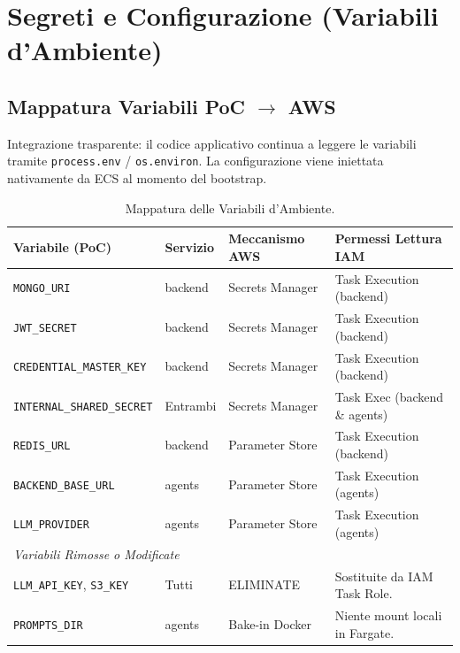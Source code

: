 \documentclass[11pt,a4paper]{article}
\begin{document}
\section{Segreti e Configurazione (Variabili d'Ambiente)}
\label{sec:aws-config}

\subsection{Mappatura Variabili PoC $\to$ AWS}

Integrazione trasparente: il codice applicativo continua a leggere le variabili tramite \texttt{process.env} / \texttt{os.environ}. La configurazione viene iniettata nativamente da ECS al momento del bootstrap.

\begin{table}[H]
\centering
\caption{Mappatura delle Variabili d'Ambiente.}
\label{tab:aws-env}
\vspace{2mm}
\renewcommand{\arraystretch}{1.15}
\begin{tabularx}{\textwidth}{|l|l|X|X|}
\hline
\textbf{Variabile (PoC)} & \textbf{Servizio} & \textbf{Meccanismo AWS} & \textbf{Permessi Lettura IAM} \\ \hline
\texttt{MONGO\_URI} & backend & Secrets Manager & Task Execution (backend) \\ \hline
\texttt{JWT\_SECRET} & backend & Secrets Manager & Task Execution (backend) \\ \hline
\texttt{CREDENTIAL\_MASTER\_KEY} & backend & Secrets Manager & Task Execution (backend) \\ \hline
\texttt{INTERNAL\_SHARED\_SECRET} & Entrambi & Secrets Manager & Task Exec (backend \& agents) \\ \hline
\texttt{REDIS\_URL} & backend & Parameter Store & Task Execution (backend) \\ \hline
\texttt{BACKEND\_BASE\_URL} & agents & Parameter Store & Task Execution (agents) \\ \hline
\texttt{LLM\_PROVIDER} & agents & Parameter Store & Task Execution (agents) \\ \hline
\multicolumn{4}{|l|}{\textit{Variabili Rimosse o Modificate}} \\ \hline
\texttt{LLM\_API\_KEY}, \texttt{S3\_KEY} & Tutti & ELIMINATE & Sostituite da IAM Task Role. \\ \hline
\texttt{PROMPTS\_DIR} & agents & Bake-in Docker & Niente mount locali in Fargate. \\ \hline
\end{tabularx}
\end{table}
\end{document}
